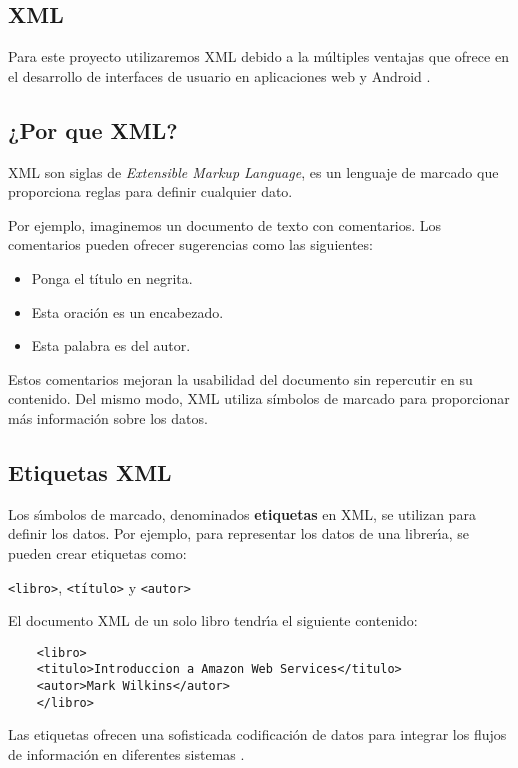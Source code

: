 

\subsection{XML}
Para este proyecto utilizaremos XML debido a la múltiples ventajas que ofrece en el desarrollo de interfaces de usuario en aplicaciones web y Android\cite{CitaA03} .  

\subsection*{¿Por que XML?}

XML son siglas de \textit{Extensible Markup Language}, es un lenguaje de marcado que proporciona reglas para definir cualquier dato.

Por ejemplo, imaginemos un documento de texto con comentarios. Los comentarios pueden ofrecer sugerencias como las siguientes:
\begin{itemize}
	\item Ponga el título en negrita.
	\item Esta oración es un encabezado.
	\item Esta palabra es del autor.
\end{itemize}

Estos comentarios mejoran la usabilidad del documento sin repercutir en su contenido. Del mismo modo, XML utiliza símbolos de marcado para proporcionar más información sobre los datos.

\subsection*{Etiquetas XML}

Los s\'{\i}mbolos de marcado, denominados \textbf{etiquetas} en XML, se utilizan para definir los datos. Por ejemplo, para representar los datos de una librer\'{\i}a, se pueden crear etiquetas como:

\texttt{\textless libro\textgreater}, \texttt{\textless t\'{\i}tulo\textgreater} y \texttt{\textless autor\textgreater}

El documento XML de un solo libro tendr\'{\i}a el siguiente contenido:

\begin{lstlisting}
	<libro>
	<titulo>Introduccion a Amazon Web Services</titulo>
	<autor>Mark Wilkins</autor>
	</libro>
\end{lstlisting}


Las etiquetas ofrecen una sofisticada codificaci\'{o}n de datos para integrar los flujos de informaci\'{o}n en diferentes sistemas \cite{CitaA04}.

